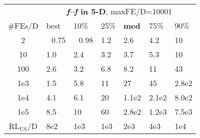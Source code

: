 \begin{tabular}{c|llllll}
 & \multicolumn{6}{|c}{\textbf{\textit{f}\raisebox{-0.35ex}{1}--\textit{f}\raisebox{-0.35ex}{24} in 5-D}, maxFE/D=10001}\\
\#FEs/D & best & 10\% & 25\% & \textbf{med} & 75\% & 90\%\\
2 & ~\,0.75 & ~\,0.98 & \hspace*{1ex}1.2 & \hspace*{1ex}2.6 & \hspace*{1ex}4.2 & 10\\
10 & \hspace*{1ex}1.0 & \hspace*{1ex}2.4 & \hspace*{1ex}3.2 & \hspace*{1ex}3.7 & \hspace*{1ex}5.3 & 10\\
100 & \hspace*{1ex}2.6 & \hspace*{1ex}3.2 & \hspace*{1ex}6.8 & \hspace*{1ex}8.2 & 11 & 43\\
1e3 & \hspace*{1ex}1.5 & \hspace*{1ex}5.8 & 11 & 27 & 45 & 2.8e2\\
1e4 & \hspace*{1ex}4.1 & \hspace*{1ex}6.1 & 20 & 1.1e2 & 2.1e2 & 8.0e2\\
1e5 & \hspace*{1ex}8.5 & 10 & 60 & 2.8e2 & 1.2e3 & 7.5e3\\
$\text{RL}_{\text{US}}$/D & 8e2 & 1e3 & 1e3 & 2e3 & 4e3 & 1e4
\end{tabular}
